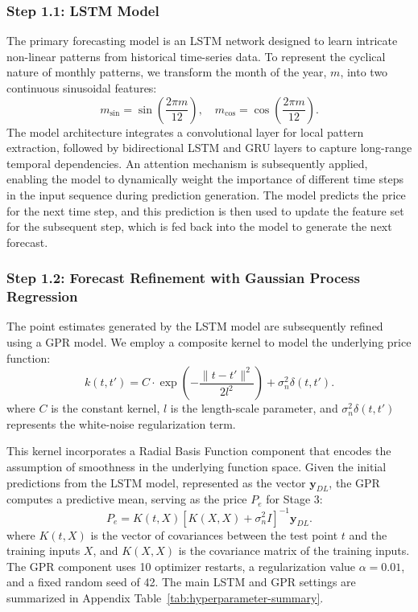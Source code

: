 \subsubsection{Step 1.1: LSTM Model}
The primary forecasting model is an LSTM network designed to learn intricate non-linear patterns from historical time-series data. To represent the cyclical nature of monthly patterns, we transform the month of the year, $m$, into two continuous sinusoidal features:
\begin{equation}
    m_{\sin}=\sin\left(\frac{2\pi m}{12}\right),\quad
    m_{\cos}=\cos\left(\frac{2\pi m}{12}\right).
\end{equation}
The model architecture integrates a convolutional layer for local pattern extraction, followed by bidirectional LSTM and GRU layers to capture long-range temporal dependencies. An attention mechanism is subsequently applied, enabling the model to dynamically weight the importance of different time steps in the input sequence during prediction generation. The model predicts the price for the next time step, and this prediction is then used to update the feature set for the subsequent step, which is fed back into the model to generate the next forecast.

\subsubsection{Step 1.2: Forecast Refinement with Gaussian Process Regression}
The point estimates generated by the LSTM model are subsequently refined using a GPR model. We employ a composite kernel to model the underlying price function:
\begin{equation}
    k(t,t')=C\cdot\exp\left(-\frac{\|t-t'\|^2}{2l^2}\right)+\sigma_n^2\delta(t,t').
\end{equation}
where $C$ is the constant kernel, $l$ is the length-scale parameter, and $\sigma_n^2\delta(t,t')$ represents the white-noise regularization term.

This kernel incorporates a Radial Basis Function component that encodes the assumption of smoothness in the underlying function space. Given the initial predictions from the LSTM model, represented as the vector $\mathbf{y}_{DL}$, the GPR computes a predictive mean, serving as the price $P_e$ for Stage 3:
\begin{equation}
    P_e=K(t,X)[K(X,X)+\sigma_n^2 I]^{-1}\mathbf{y}_{DL}.
\end{equation}
where $K(t,X)$ is the vector of covariances between the test point $t$ and the training inputs $X$, and $K(X,X)$ is the covariance matrix of the training inputs. The GPR component uses 10 optimizer restarts, a regularization value $\alpha=0.01$, and a fixed random seed of 42. The main LSTM and GPR settings are summarized in Appendix Table~\ref{tab:hyperparameter-summary}.


